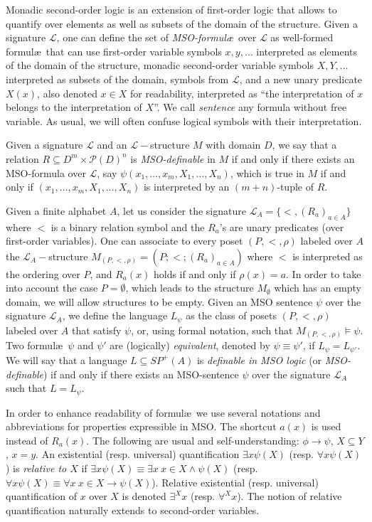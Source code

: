 \documentclass{CSML}
\newcommand{\Pf}[1]{\ensuremath{{\mathcal P}(#1)}}
\begin{document}
Monadic second-order logic is an extension of first-order logic  that allows to quantify over elements as well as subsets of the domain of the structure. Given a signature $\mathcal L$, one can define the set of {\em MSO-formul{\ae}}\ over ${\mathcal L}$ as well-formed formul{\ae}\ that can use first-order variable symbols $x,y,\dots$ interpreted as elements of the domain of the structure, monadic second-order variable symbols $X,Y,\dots$ interpreted as subsets of the domain, symbols from ${\mathcal L}$, and a new unary predicate $X(x)$, also denoted $x\in X$ for readability, interpreted as ``the interpretation of $x$ belongs to the interpretation of $X$''. We call \emph{sentence} any formula without free variable. As usual, we will often confuse logical symbols with their interpretation.

Given a signature ${\mathcal L}$ and an  ${\mathcal L}-$structure $M$ with domain $D$, we say that a relation $R \subseteq D^m \times \Pf{D}^n$ is \emph{MSO-definable} in $M$ if and only if there exists an MSO-formula over ${\mathcal L}$, say $\psi(x_1,\dots,x_m,X_1,\dots,X_n)$, which is true in $M$ if and only if $(x_1,\dots,x_m,X_1,\dots,X_n)$ is interpreted by an $(m+n)$-tuple of $R$. 

Given a finite alphabet $A$, let us consider the signature ${\mathcal L}_A=\{<,(R_a)_{a \in A}\}$ where $<$ is a binary relation symbol and the $R_a$'s are unary predicates (over first-order variables). One can associate to every poset $(P,<,\rho)$ labeled over $A$ the ${\mathcal L}_A-$structure $M_{(P,<,\rho)}=(P;<;(R_a)_{a \in A})$ where $<$ is interpreted as the ordering over $P$, and $R_a(x)$ holds if and only if $\rho(x)=a$. In order to take into account the case $P=\emptyset$, which leads to the structure $M_{\emptyset}$ which has an empty domain, we will allow structures to be empty.  Given an MSO sentence $\psi$ over the signature ${\mathcal L}_A$, we define the language $L_\psi$ as the class of posets $(P,<,\rho)$ labeled over $A$ that satisfy $\psi$, or, using formal notation, such that $M_{(P,<,\rho)} \models \psi$. Two formul{\ae}\ $\psi$ and $\psi'$ are (logically) \emph{equivalent}, denoted by $\psi\equiv\psi'$, if $L_\psi=L_{\psi'}$. We will say that a language $L\subseteq SP^+(A)$ is {\em definable in MSO logic} (or {\em MSO-definable}) if and only if there exists an MSO-sentence $\psi$ over the signature ${\mathcal L}_A$ such that $L=L_\psi$.

In order to enhance readability of formul\ae\ we use several notations and abbreviations for properties expressible in MSO.
The shortcut $a(x)$ is used instead of $R_a(x)$.
The following are usual and self-understanding:
$\phi\rightarrow\psi$, 
$X\subseteq Y$,
$x=y$.
An existential (resp. universal) quantification $\exists x \psi(X)$ (resp. $\forall x\psi(X)$) is \emph{relative to $X$} if  $\exists x \psi(X)\equiv \exists x\ x\in X\land \psi(X)$ (resp. $\forall x \psi(X)\equiv \forall x\ x\in X\rightarrow\psi(X)$). Relative existential (resp. universal) quantification of $x$ over $X$ is denoted $\exists^X x$ (resp. $\forall^X x$). The notion of relative quantification naturally extends to second-order variables.
\end{document}
